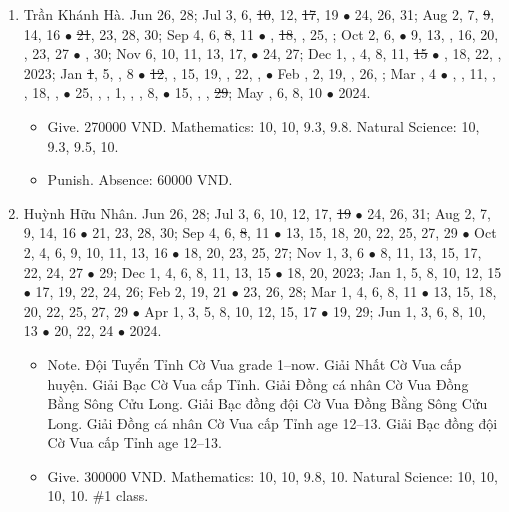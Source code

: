 \documentclass{article}
\begin{document}
\begin{enumerate}
	\item {\sc Trần Khánh Hà.} {\sf[In]} Jun 26, 28; Jul 3, 6, \st{10}, 12, \st{17}, 19 $\bullet$ 24, 26, 31; Aug 2, 7, \st{9}, 14, 16 $\bullet$ \st{21}, 23, 28, 30; Sep 4, 6, \st{8}, 11 $\bullet$ , \st{18}, , 25, ; Oct 2, 6,   $\bullet$ 9, 13, , 16, 20, , 23, 27 $\bullet$ , 30; Nov 6, 10, 11, 13, 17,  $\bullet$ 24, 27; Dec 1, , 4, 8, 11, \st{15} $\bullet$ , 18, 22, , 2023; Jan \st{1}, 5, , 8  $\bullet$ \st{12}, , 15, 19, , 22, ,  $\bullet$ Feb , 2, 19, , 26, ; Mar , 4 $\bullet$ , , 11, , , 18, ,  $\bullet$ 25, , , 1, , , 8,  $\bullet$ 15, , , \st{29}; May , 6, 8, 10 $\bullet$ 2024.
	\begin{itemize}
		\item {\sf Give.} 270000 VND. Mathematics: 10, 10, 9.3, 9.8. Natural Science: 10, 9.3, 9.5, 10.
		\item {\sf Punish.} Absence: 60000 VND.
	\end{itemize}
	\item {\sc Huỳnh Hữu Nhân.} {\sf[In]} Jun 26, 28; Jul 3, 6, 10, 12, 17, \st{19} $\bullet$ 24, 26, 31; Aug 2, 7, 9, 14, 16 $\bullet$ 21, 23, 28, 30; Sep 4, 6, \st{8}, 11 $\bullet$ 13, 15, 18, 20, 22, 25, 27, 29 $\bullet$ Oct 2, 4, 6, 9, 10, 11, 13, 16 $\bullet$ 18, 20, 23, 25, 27; Nov 1, 3, 6 $\bullet$ 8, 11, 13, 15, 17, 22, 24, 27 $\bullet$ 29; Dec 1, 4, 6, 8, 11, 13, 15 $\bullet$ 18, 20, 2023; Jan 1, 5, 8, 10, 12, 15 $\bullet$ 17, 19, 22, 24, 26; Feb 2, 19, 21 $\bullet$ 23, 26, 28; Mar 1, 4, 6, 8, 11 $\bullet$ 13, 15, 18, 20, 22, 25, 27, 29 $\bullet$ Apr 1, 3, 5, 8, 10, 12, 15, 17 $\bullet$ 19, 29; Jun 1, 3, 6, 8, 10, 13 $\bullet$ 20, 22, 24 $\bullet$ 2024.
	\begin{itemize}
		\item {\sf Note.} Đội Tuyển Tỉnh Cờ Vua grade 1--now. Giải Nhất Cờ Vua cấp huyện. Giải Bạc Cờ Vua cấp Tỉnh. Giải Đồng cá nhân Cờ Vua Đồng Bằng Sông Cửu Long. Giải Bạc đồng đội Cờ Vua Đồng Bằng Sông Cửu Long. Giải Đồng cá nhân Cờ Vua cấp Tỉnh age 12--13. Giải Bạc đồng đội Cờ Vua cấp Tỉnh age 12--13.
		\item {\sf Give.} 300000 VND. Mathematics: 10, 10, 9.8, 10. Natural Science: 10, 10, 10, 10. \#1 class.
	\end{itemize}

\end{enumerate}
\end{document}
